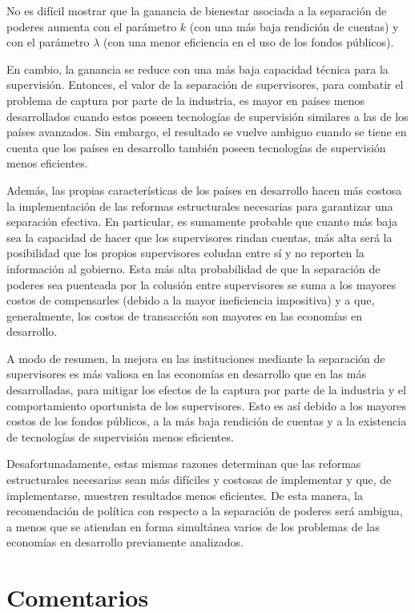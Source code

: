 \documentclass[
  12pt,
  spanish,
]{book}
\begin{document}
No es difícil mostrar que la ganancia de bienestar asociada a la separación de poderes aumenta con el parámetro \(k\) (con una más baja rendición de cuentas) y con el parámetro \(λ\) (con una menor eficiencia en el uso de los fondos públicos).

En cambio, la ganancia se reduce con una más baja capacidad técnica para la supervisión. Entonces, el valor de la separación de supervisores, para combatir el problema de captura por parte de la industria, es mayor en países menos desarrollados cuando estos poseen tecnologías de supervisión similares a las de los países avanzados. Sin embargo, el resultado se vuelve ambiguo cuando se tiene en cuenta que los países en desarrollo también poseen tecnologías de supervisión menos eficientes.

Además, las propias características de los países en desarrollo hacen más costosa la implementación de las reformas estructurales necesarias para garantizar una separación efectiva. En particular, es sumamente probable que cuanto más baja sea la capacidad de hacer que los supervisores rindan cuentas, más alta será la posibilidad que los propios supervisores coludan entre sí y no reporten la información al gobierno. Esta más alta probabilidad de que la separación de poderes sea puenteada por la colusión entre supervisores se suma a los mayores costos de compensarles (debido a la mayor ineficiencia impositiva) y a que, generalmente, los costos de transacción son mayores en las economías en desarrollo.

A modo de resumen, la mejora en las instituciones mediante la separación de supervisores es más valiosa en las economías en desarrollo que en las más desarrolladas, para mitigar los efectos de la captura por parte de la industria y el comportamiento oportunista de los supervisores. Esto es así debido a los mayores costos de los fondos públicos, a la más baja rendición de cuentas y a la existencia de tecnologías de supervisión menos eficientes.

Desafortunadamente, estas mismas razones determinan que las reformas estructurales necesarias sean más difíciles y costosas de implementar y que, de implementarse, muestren resultados menos eficientes. De esta manera, la recomendación de política con respecto a la separación de poderes será ambigua, a menos que se atiendan en forma simultánea varios de los problemas de las economías en desarrollo previamente analizados.

\hypertarget{coment-fin}{%
\section{Comentarios}\label{coment-fin}}
\end{document}
